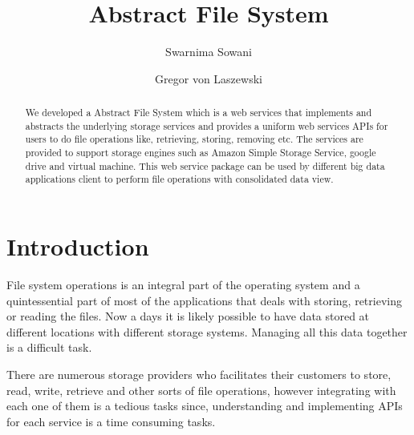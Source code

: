 
\title{Abstract File System}


\author{Swarnima Sowani}

\author{Gregor von Laszewski}


\renewcommand{\shortauthors}{G. v. Laszewski}


\begin{abstract}
  We developed a Abstract File System which is a web services that
  implements and abstracts the underlying storage services and
  provides a uniform web services APIs for users to do file operations
  like, retrieving, storing, removing etc. The services are provided
  to support storage engines such as Amazon Simple Storage Service,
  google drive and virtual machine. This web service package can be
  used by different big data applications client to perform file
  operations with consolidated data view.
\end{abstract}



\maketitle


\section{Introduction}

File system operations is an integral part of the operating system and
a quintessential part of most of the applications that deals with
storing, retrieving or reading the files. Now a days it is likely
possible to have data stored at different locations with different
storage systems. Managing all this data together is a difficult task.

There are numerous storage providers who facilitates their customers
to store, read, write, retrieve and other sorts of file operations,
however integrating with each one of them is a tedious tasks since,
understanding and implementing APIs for each service is a time
consuming tasks.

